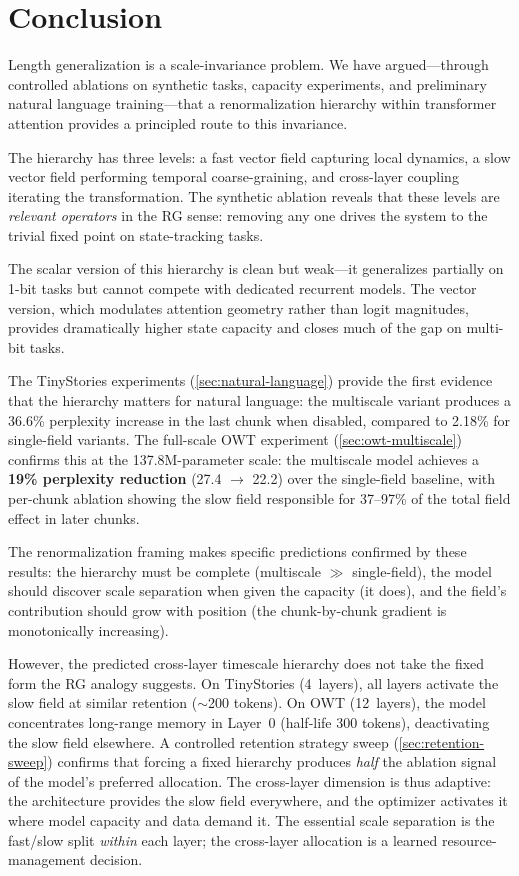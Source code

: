 \documentclass[11pt,a4paper]{article}
\begin{document}
\section{Conclusion}
\label{sec:conclusion}

Length generalization is a scale-invariance problem.  We have
argued---through controlled ablations on synthetic tasks, capacity
experiments, and preliminary natural language training---that a
renormalization hierarchy within transformer attention provides a
principled route to this invariance.

The hierarchy has three levels: a fast vector field capturing local
dynamics, a slow vector field performing temporal coarse-graining,
and cross-layer coupling iterating the transformation.  The synthetic
ablation reveals that these levels are \emph{relevant operators} in
the RG sense: removing any one drives the system to the trivial
fixed point on state-tracking tasks.

The scalar version of this hierarchy is clean but weak---it
generalizes partially on 1-bit tasks but cannot compete with
dedicated recurrent models.  The vector version, which modulates
attention geometry rather than logit magnitudes, provides
dramatically higher state capacity and closes much of the gap on
multi-bit tasks.

The TinyStories experiments (\cref{sec:natural-language}) provide the
first evidence that the hierarchy matters for natural language: the
multiscale variant produces a 36.6\% perplexity increase in the last
chunk when disabled, compared to 2.18\% for single-field variants.
The full-scale OWT experiment (\cref{sec:owt-multiscale}) confirms
this at the 137.8M-parameter scale: the multiscale model achieves a
\textbf{19\% perplexity reduction} (27.4 $\to$ 22.2) over the
single-field baseline, with per-chunk ablation showing the slow field
responsible for 37--97\% of the total field effect in later chunks.

The renormalization framing makes specific predictions confirmed by
these results: the hierarchy must be complete (multiscale $\gg$
single-field), the model should discover scale separation when given
the capacity (it does), and the field's contribution should grow with
position (the chunk-by-chunk gradient is monotonically increasing).

However, the predicted cross-layer timescale hierarchy does not
take the fixed form the RG analogy suggests.  On TinyStories
(4~layers), all layers activate the slow field at similar retention
($\sim$200 tokens).  On OWT (12~layers), the model concentrates
long-range memory in Layer~0 (half-life 300 tokens), deactivating
the slow field elsewhere.  A controlled retention strategy sweep
(\cref{sec:retention-sweep}) confirms that forcing a fixed hierarchy
produces \emph{half} the ablation signal of the model's preferred
allocation.  The cross-layer dimension is thus adaptive: the
architecture provides the slow field everywhere, and the optimizer
activates it where model capacity and data demand it.  The essential
scale separation is the fast/slow split \emph{within} each layer;
the cross-layer allocation is a learned resource-management decision.
\end{document}
